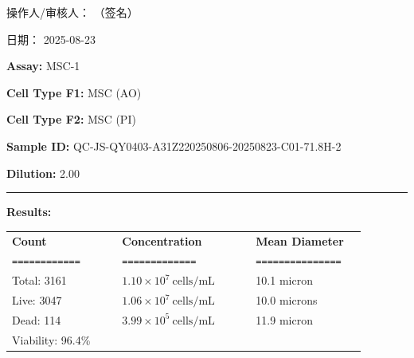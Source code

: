 \documentclass[UTF8,10pt,a4paper,fontset=fandol]{ctexart}
\newcommand{\fieldvalue}[1]{#1}
\newcommand{\handwritten}[1]{#1}
\begin{document}
\vfill

操作人/审核人：
\fieldvalue{\handwritten{（签名）}}

\hfill 日期：
\fieldvalue{\handwritten{2025-08-23}}

\newpage

\noindent\textbf{Assay:}
\fieldvalue{MSC-1}

\medskip
\noindent\textbf{Cell Type F1:}
\fieldvalue{MSC (AO)}

\noindent\textbf{Cell Type F2:}
\fieldvalue{MSC (PI)}

\medskip
\noindent\textbf{Sample ID:}
\fieldvalue{QC-JS-QY0403-A31Z220250806-20250823-C01-71.8H-2}

\noindent\textbf{Dilution:}
\fieldvalue{2.00}

\medskip
\noindent\rule{\linewidth}{0.4pt}

\noindent\textbf{Results:}

\medskip
\noindent
\begin{tabular}{@{}p{0.29\linewidth}p{0.34\linewidth}p{0.29\linewidth}@{}}
\textbf{Count} & \textbf{Concentration} & \textbf{Mean Diameter} \\
\texttt{============} & \texttt{=============} & \texttt{===============} \\[2pt]
Total:
\fieldvalue{3161}
&
\fieldvalue{$1.10\times10^{7}\ \mathrm{cells/mL}$}
&
\fieldvalue{10.1 micron}
\\
Live:
\fieldvalue{3047}
&
\fieldvalue{$1.06\times10^{7}\ \mathrm{cells/mL}$}
&
\fieldvalue{10.0 microns}
\\
Dead:
\fieldvalue{114}
&
\fieldvalue{$3.99\times10^{5}\ \mathrm{cells/mL}$}
&
\fieldvalue{11.9 micron}
\\
Viability:
\fieldvalue{96.4\%}
&
&
\end{tabular}
\end{document}
